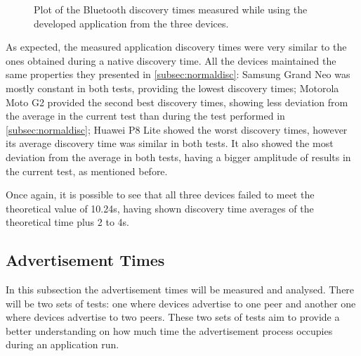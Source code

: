 \begin{figure}[ht]
	\noindent{}
	\caption{\label{fig:appdisc} Plot of the Bluetooth discovery times measured while using the developed application from the three devices.}
\end{figure}

As expected, the measured application discovery times were very similar to the ones obtained during a native discovery time. All the devices maintained the same properties they presented in \ref{subsec:normaldisc}: Samsung Grand Neo was mostly constant in both tests, providing the lowest discovery times; Motorola Moto G2 provided the second best discovery times, showing less deviation from the average in the current test than during the test performed in \ref{subsec:normaldisc}; Huawei P8 Lite showed the worst discovery times, however its average discovery time was similar in both tests. It also showed the most deviation from the average in both tests, having a bigger amplitude of results in the current test, as mentioned before.

Once again, it is possible to see that all three devices failed to meet the theoretical value of 10.24s, having shown discovery time averages of the theoretical time plus 2 to 4s.

\subsection{Advertisement Times}

In this subsection the advertisement times will be measured and analysed. There will be two sets of tests: one where devices advertise to one peer and another one where devices advertise to two peers. These two sets of tests aim to provide a better understanding on how much time the advertisement process occupies during an application run.

